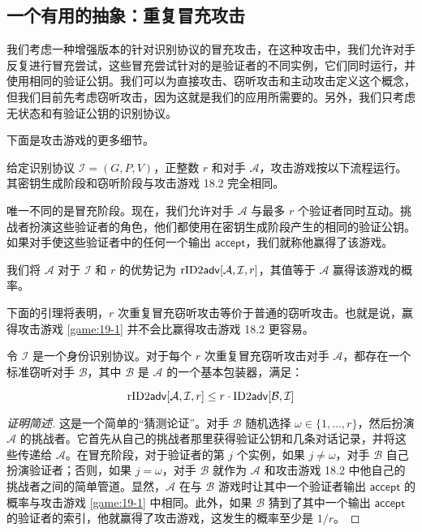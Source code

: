 \subsection{一个有用的抽象：重复冒充攻击}

我们考虑一种增强版本的针对识别协议的冒充攻击，在这种攻击中，我们允许对手反复进行冒充尝试，这些冒充尝试针对的是验证者的不同实例，它们同时运行，并使用相同的验证公钥。我们可以为直接攻击、窃听攻击和主动攻击定义这个概念，但我们目前先考虑窃听攻击，因为这就是我们的应用所需要的。另外，我们只考虑无状态和有验证公钥的识别协议。

下面是攻击游戏的更多细节。

\begin{game}[$r$ 次重复冒充窃听攻击]\label{game:19-1}
给定识别协议 $\mathcal{I}=(G,P,V)$，正整数 $r$ 和对手 $\mathcal{A}$，攻击游戏按以下流程运行。其密钥生成阶段和窃听阶段与攻击游戏 18.2 完全相同。

唯一不同的是冒充阶段。现在，我们允许对手 $\mathcal{A}$ 与最多 $r$ 个验证者同时互动。挑战者扮演这些验证者的角色，他们都使用在密钥生成阶段产生的相同的验证公钥。如果对手使这些验证者中的任何一个输出 $\mathsf{accept}$，我们就称他赢得了该游戏。

我们将 $\mathcal{A}$ 对于 $\mathcal{I}$ 和 $r$ 的优势记为 ${\rm rID2\mathsf{adv}}[\mathcal{A},\mathcal{I},r]$，其值等于 $\mathcal{A}$ 赢得该游戏的概率。
\end{game}

下面的引理将表明，$r$ 次重复冒充窃听攻击等价于普通的窃听攻击。也就是说，赢得攻击游戏 \ref{game:19-1} 并不会比赢得攻击游戏 18.2 更容易。

\begin{lemma}\label{theo:19-6}
令 $\mathcal{I}$ 是一个身份识别协议。对于每个 $r$ 次重复冒充窃听攻击对手 $\mathcal{A}$，都存在一个标准窃听对手 $\mathcal{B}$，其中 $\mathcal{B}$ 是 $\mathcal{A}$ 的一个基本包装器，满足：

\begin{equation}
{\rm rID2\mathsf{adv}}[\mathcal{A},\mathcal{I},r]\leq r\cdot{\rm ID2\mathsf{adv}}[\mathcal{B}, \mathcal{I}]
\end{equation}

\end{lemma}

\begin{proof}[证明简述]
这是一个简单的“猜测论证”。对手 $\mathcal{B}$ 随机选择 $\omega\in\{1,\dots,r\}$，然后扮演 $\mathcal{A}$ 的挑战者。它首先从自己的挑战者那里获得验证公钥和几条对话记录，并将这些传递给 $\mathcal{A}$。在冒充阶段，对于验证者的第 $j$ 个实例，如果 $j\neq\omega$，对手 $\mathcal{B}$ 自己扮演验证者；否则，如果 $j=\omega$，对手 $\mathcal{B}$ 就作为 $\mathcal{A}$ 和攻击游戏 18.2 中他自己的挑战者之间的简单管道。显然，$\mathcal{A}$ 在与 $\mathcal{B}$ 游戏时让其中一个验证者输出 $\mathsf{accept}$ 的概率与攻击游戏 \ref{game:19-1} 中相同。此外，如果 $\mathcal{B}$ 猜到了其中一个输出 $\mathsf{accept}$ 的验证者的索引，他就赢得了攻击游戏，这发生的概率至少是 ${1}/{r}$。
\end{proof}

